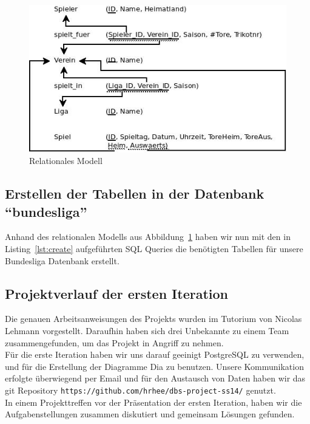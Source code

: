 \documentclass[
10pt,
a4paper
]{scrartcl}
\begin{document}
\begin{figure}[H]
	\centering
  \includegraphics[scale=0.6]{relat.jpg}
	\caption{Relationales Modell }
	\label{fig:relat}
\end{figure}

\subsection{Erstellen der Tabellen in der Datenbank “bundesliga”}
Anhand des relationalen Modells aus Abbildung~\ref{fig:relat} haben wir nun mit den in Listing~\ref{lst:create} aufgeführten SQL Queries die benötigten Tabellen für unsere Bundesliga Datenbank erstellt.
 


\subsection{Projektverlauf der ersten Iteration}

Die genauen Arbeitsanweisungen des Projekts wurden im Tutorium von Nicolas Lehmann vorgestellt. Daraufhin haben sich drei Unbekannte  zu einem Team zusammengefunden, um das Projekt in Angriff zu nehmen.\\
Für die erste Iteration haben wir uns darauf geeinigt PostgreSQL zu verwenden, und für die Erstellung der Diagramme Dia zu benutzen. Unsere Kommunikation erfolgte überwiegend per Email und für den Austausch von Daten haben wir das git  Repository \texttt{https://github.com/hrhee/dbs-project-ss14/} genutzt.\\
In einem Projekttreffen vor der Präsentation der ersten Iteration, haben wir die Aufgabenstellungen zusammen diskutiert und gemeinsam Lösungen gefunden.
\end{document}
